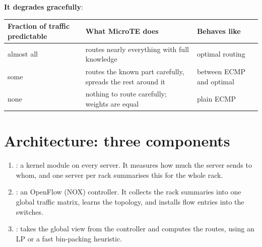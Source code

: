 \textbf{It degrades gracefully}:
\begin{center}
\begin{tabular}{@{}lll@{}}
\toprule
Fraction of traffic predictable & What MicroTE does & Behaves like\\
\midrule
almost all & routes nearly everything with full knowledge & optimal routing\\
some & routes the known part carefully, spreads the rest around it & between ECMP and optimal\\
none & nothing to route carefully; weights are equal & plain ECMP\\
\bottomrule
\end{tabular}
\end{center}

\section{Architecture: three components}


\begin{enumerate}
  \item {}: a kernel module on every server. It measures how much the server sends to whom, and one server per rack
        summarises this for the whole rack.
  \item {}: an OpenFlow (NOX) controller. It collects the rack summaries into one global traffic matrix, learns the
        topology, and installs flow entries into the switches.
  \item {}: takes the global view from the controller and computes the routes, using an LP or a fast bin-packing heuristic.
\end{enumerate}

